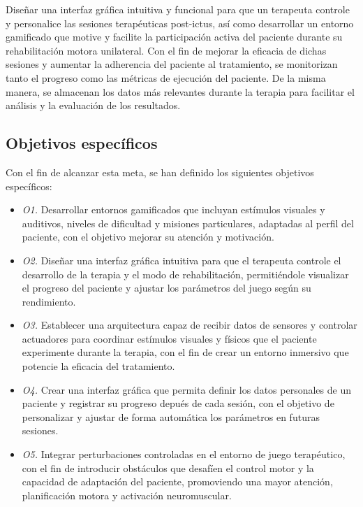 Diseñar una interfaz gráfica intuitiva y funcional para que un terapeuta controle y personalice las sesiones terapéuticas post-ictus, así como desarrollar un entorno gamificado que motive y facilite la participación activa del paciente durante su rehabilitación motora unilateral.
Con el fin de mejorar la eficacia de dichas sesiones y aumentar la adherencia del paciente al tratamiento, se monitorizan tanto el progreso como las métricas de ejecución del paciente.
De la misma manera, se almacenan los datos más relevantes durante la terapia para facilitar el análisis y la evaluación de los resultados.

\subsection{Objetivos específicos}
\label{sec:descripcion}

Con el fin de alcanzar esta meta, se han definido los siguientes objetivos específicos:

\begin{itemize}
    \item \textit{O1.} Desarrollar entornos gamificados que incluyan estímulos visuales y auditivos, niveles de dificultad y misiones particulares, adaptadas al perfil del paciente, con el objetivo mejorar su atención y motivación.
    \item \textit{O2.} Diseñar una interfaz gráfica intuitiva para que el terapeuta controle el desarrollo de la terapia y el modo de rehabilitación, permitiéndole visualizar el progreso del paciente y ajustar los parámetros del juego según su rendimiento.
    \item \textit{O3.} Establecer una arquitectura capaz de recibir datos de sensores y controlar actuadores para coordinar estímulos visuales y físicos que el paciente experimente durante la terapia, con el fin de crear un entorno inmersivo que potencie la eficacia del tratamiento.
    \item \textit{O4.} Crear una interfaz gráfica que permita definir los datos personales de un paciente y registrar su progreso depués de cada sesión, con el objetivo de personalizar y ajustar de forma automática los parámetros en futuras sesiones.
    \item \textit{O5.} Integrar perturbaciones controladas en el entorno de juego terapéutico, con el fin de introducir obstáculos que desafíen el control motor y la capacidad de adaptación del paciente, promoviendo una mayor atención, planificación motora y activación neuromuscular.
\end{itemize}\

